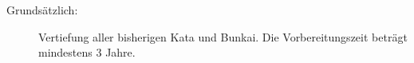 {\footnotesize 	\begin{description}
	\item[Grundsätzlich:]Vertiefung aller bisherigen Kata und Bunkai. Die Vorbereitungszeit beträgt mindestens 3 Jahre.
	\end{description}}
